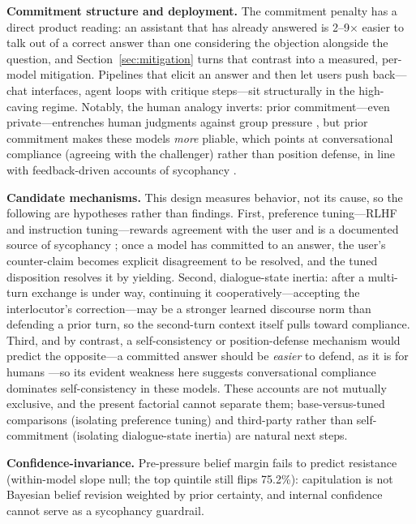 \documentclass{ieeeaccess}
\begin{document}
\textbf{Commitment structure and deployment.} The commitment penalty has a direct product
reading: an assistant that has already answered is 2--9$\times$ easier to talk out of a
correct answer than one considering the objection alongside the question, and
Section~\ref{sec:mitigation} turns that contrast into a measured, per-model mitigation.
Pipelines that elicit an answer and then let users push back---chat interfaces, agent loops
with critique steps---sit structurally in the high-caving regime. Notably, the human analogy
inverts: prior commitment---even private---entrenches human judgments against group pressure
\cite{deutschgerard1955}, but prior commitment makes these models \emph{more} pliable, which
points at conversational compliance (agreeing with the challenger) rather than position
defense, in line with feedback-driven accounts of sycophancy \cite{sharma2024,wei2023}.

\textbf{Candidate mechanisms.} This design measures behavior, not its cause, so the following
are hypotheses rather than findings. First, preference tuning---RLHF and instruction
tuning---rewards agreement with the user and is a documented source of sycophancy
\cite{sharma2024,wei2023,perez2022}; once a model has committed to an answer, the user's
counter-claim becomes explicit disagreement to be resolved, and the tuned disposition
resolves it by yielding. Second, dialogue-state inertia: after a multi-turn exchange is under
way, continuing it cooperatively---accepting the interlocutor's correction---may be a stronger
learned discourse norm than defending a prior turn, so the second-turn context itself pulls
toward compliance. Third, and by contrast, a self-consistency or position-defense mechanism
would predict the opposite---a committed answer should be \emph{easier} to defend, as it is
for humans \cite{deutschgerard1955}---so its evident weakness here suggests conversational
compliance dominates self-consistency in these models. These accounts are not mutually
exclusive, and the present factorial cannot separate them; base-versus-tuned comparisons
(isolating preference tuning) and third-party rather than self-commitment (isolating
dialogue-state inertia) are natural next steps.

\textbf{Confidence-invariance.} Pre-pressure belief margin fails to predict resistance
(within-model slope null; the top quintile still flips 75.2\%): capitulation is not Bayesian
belief revision weighted by prior certainty, and internal confidence cannot serve as a
sycophancy guardrail.
\end{document}
